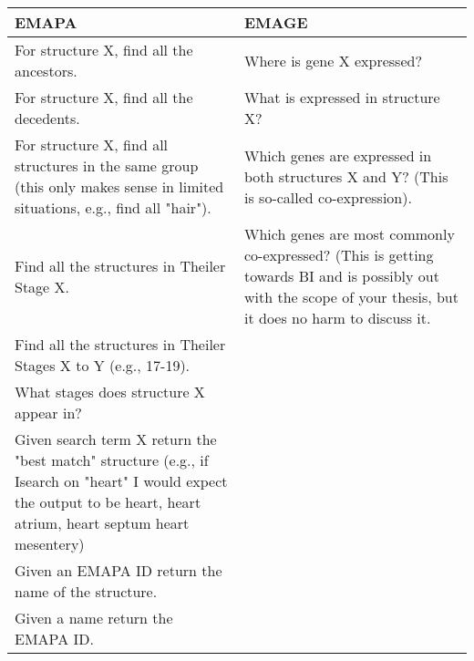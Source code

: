 \begin{center}
    \begin{tabular}{ | p{0.5\linewidth} | p{0.5\linewidth}|}
    \hline
    \textbf{EMAPA} & \textbf{EMAGE} \\ \hline
    For structure X, find all the ancestors. &  Where is gene X expressed? \\ \hline
    For structure X, find all the decedents. &  What is expressed in structure X? \\ \hline
    For structure X, find all structures in the same group (this only makes sense in limited situations, e.g., find all "hair"). & Which genes are expressed in both structures X and Y?  (This is so-called co-expression). \\ \hline
    Find all the structures in Theiler Stage X. & Which genes are most commonly co-expressed? (This is getting towards BI and is possibly out with the scope of your thesis, but it does no harm to discuss it. \\ \hline
    Find all the structures in Theiler Stages X to Y (e.g., 17-19). &  \\ \hline
    What stages does structure X appear in? & \\ \hline
    Given search term X return the "best match" structure (e.g., if Isearch on "heart" I would expect the output to be heart, heart atrium, heart septum  heart mesentery) & \\ \hline
    Given an EMAPA ID return the name of the structure. &  \\ \hline
    Given a name return the EMAPA ID. &  \\ \hline
    \end{tabular}
\end{center}






